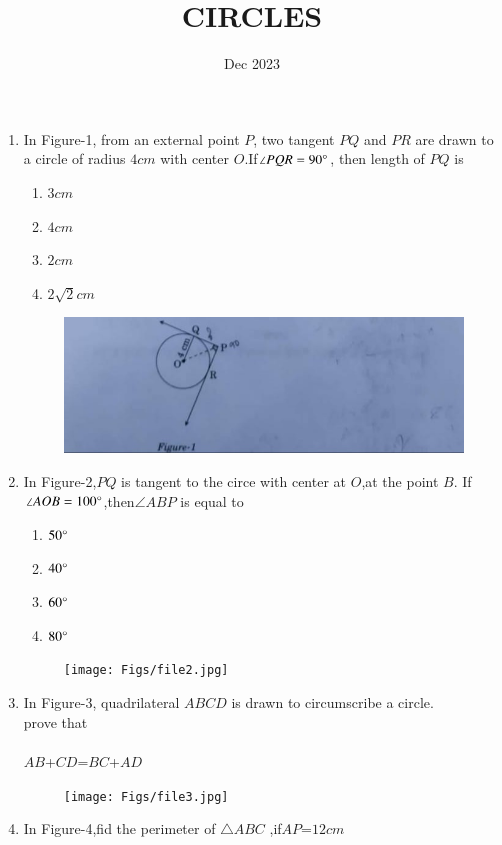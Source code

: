 \documentclass[12pt,-letter paper]{article}
\title{CIRCLES}
\author{}
\date{Dec 2023}
\begin{document}
\maketitle

\begin{enumerate}
\item In Figure-1, from an external point $P$, two tangent $PQ$ and $PR$ are drawn to a circle of radius $4 cm$ with center $O$.If$\angle{PQR}= 90\degree  $,
then length of $PQ$ is \newline
\begin{enumerate}[label=(\alph*)]
\item $3 cm$ 
\item $4 cm$ 
\item $2 cm$
\item $2{\sqrt{2}} cm$ 
\end{enumerate}

 \begin{figure}[H]
\centering
\includegraphics[width=\columnwidth]{Figs/file1.jpg}
\caption{}
\label{fig:Figure1}
 \end{figure}
 

 \item In Figure-2,$PQ$ is tangent to the circe with center at $O$,at the point $B$. If$\angle{AOB}=100\degree $,then$\angle{ABP}$ is equal to \newline
\begin{enumerate}[label=(\alph*)] 
\item $50\degree$ 
\item $40\degree$ 
\item $60\degree$ 
\item $80\degree$
\end{enumerate}
		\begin{figure}[H]
	\centering
	\texttt{[image: Figs/file2.jpg]}
	\caption{}
	\label{fig:figure2}
        \end{figure}
	

\item In Figure-3, quadrilateral $ABCD$ is drawn to circumscribe a circle.\\
prove that\\
\\
$AB$+$CD$=$BC$+$AD$
		\begin{figure}[H]
\centering
\texttt{[image: Figs/file3.jpg]}
\caption{}
\label{fig:Figure3}
\end{figure}
\item In Figure-4,fid the perimeter of $\triangle ABC $ ,if$AP$=$12 cm$\\


\end{enumerate}
\end{document}

